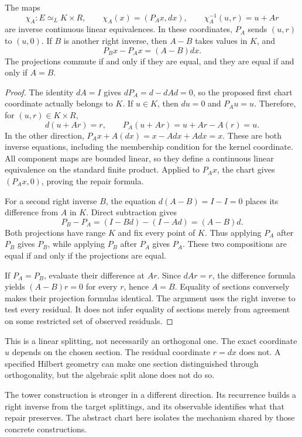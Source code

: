 \begin{theorem}\label{KS65}
The maps
\[
 \chi_A:E\simeq_L K\times R,\qquad
 \chi_A(x)=(P_Ax,dx),\qquad
 \chi_A^{-1}(u,r)=u+Ar
\]
are inverse continuous linear equivalences. In these coordinates, \(P_A\) sends \((u,r)\) to \((u,0)\). If \(B\) is another right inverse, then \(A-B\) takes values in \(K\), and
\[
 P_Bx-P_Ax=(A-B)dx.
\]
The projections commute if and only if they are equal, and they are equal if and only if \(A=B\).
\end{theorem}
\begin{proof}
The identity \(dA=I\) gives \(dP_A=d-dAd=0\), so the proposed first chart coordinate actually belongs to \(K\). If \(u\in K\), then \(du=0\) and \(P_Au=u\). Therefore, for \((u,r)\in K\times R\),
\[
 d(u+Ar)=r,\qquad P_A(u+Ar)=u+Ar-A(r)=u.
\]
In the other direction, \(P_Ax+A(dx)=x-Adx+Adx=x\). These are both inverse equations, including the membership condition for the kernel coordinate. All component maps are bounded linear, so they define a continuous linear equivalence on the standard finite product. Applied to \(P_Ax\), the chart gives \((P_Ax,0)\), proving the repair formula.

For a second right inverse \(B\), the equation \(d(A-B)=I-I=0\) places its difference from \(A\) in \(K\). Direct subtraction gives
\[
 P_B-P_A=(I-Bd)-(I-Ad)=(A-B)d.
\]
Both projections have range \(K\) and fix every point of \(K\). Thus applying \(P_A\) after \(P_B\) gives \(P_B\), while applying \(P_B\) after \(P_A\) gives \(P_A\). These two compositions are equal if and only if the projections are equal.

If \(P_A=P_B\), evaluate their difference at \(Ar\). Since \(dAr=r\), the difference formula yields \((A-B)r=0\) for every \(r\), hence \(A=B\). Equality of sections conversely makes their projection formulas identical. The argument uses the right inverse to test every residual. It does not infer equality of sections merely from agreement on some restricted set of observed residuals.
\end{proof}
This is a linear splitting, not necessarily an orthogonal one. The exact coordinate \(u\) depends on the chosen section. The residual coordinate \(r=dx\) does not. A specified Hilbert geometry can make one section distinguished through orthogonality, but the algebraic split alone does not do so.

The tower construction is stronger in a different direction. Its recurrence builds a right inverse from the target splittings, and its observable identifies what that repair preserves. The abstract chart here isolates the mechanism shared by those concrete constructions.

